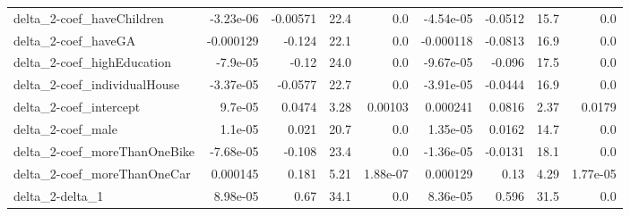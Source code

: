 \begin{tabular}{lrrrrrrrr}
delta_2-coef_haveChildren & -3.23e-06 & -0.00571 & 22.4 & 0.0 & -4.54e-05 & -0.0512 & 15.7 & 0.0 \\
delta_2-coef_haveGA & -0.000129 & -0.124 & 22.1 & 0.0 & -0.000118 & -0.0813 & 16.9 & 0.0 \\
delta_2-coef_highEducation & -7.9e-05 & -0.12 & 24.0 & 0.0 & -9.67e-05 & -0.096 & 17.5 & 0.0 \\
delta_2-coef_individualHouse & -3.37e-05 & -0.0577 & 22.7 & 0.0 & -3.91e-05 & -0.0444 & 16.9 & 0.0 \\
delta_2-coef_intercept & 9.7e-05 & 0.0474 & 3.28 & 0.00103 & 0.000241 & 0.0816 & 2.37 & 0.0179 \\
delta_2-coef_male & 1.1e-05 & 0.021 & 20.7 & 0.0 & 1.35e-05 & 0.0162 & 14.7 & 0.0 \\
delta_2-coef_moreThanOneBike & -7.68e-05 & -0.108 & 23.4 & 0.0 & -1.36e-05 & -0.0131 & 18.1 & 0.0 \\
delta_2-coef_moreThanOneCar & 0.000145 & 0.181 & 5.21 & 1.88e-07 & 0.000129 & 0.13 & 4.29 & 1.77e-05 \\
delta_2-delta_1 & 8.98e-05 & 0.67 & 34.1 & 0.0 & 8.36e-05 & 0.596 & 31.5 & 0.0 \\
\end{tabular}
